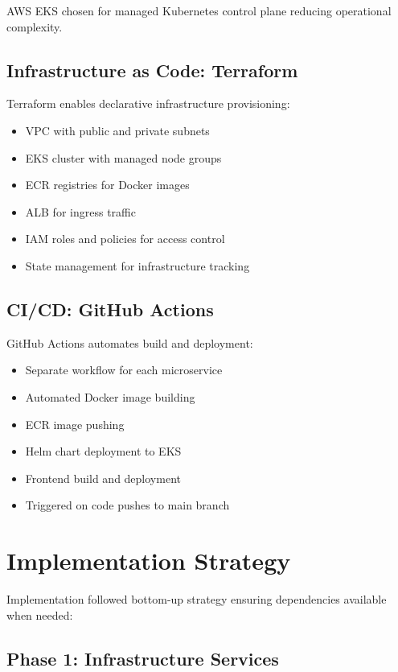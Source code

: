 AWS EKS chosen for managed Kubernetes control plane reducing operational complexity.

\subsection{Infrastructure as Code: Terraform}

Terraform enables declarative infrastructure provisioning:
\begin{itemize}
    \item VPC with public and private subnets
    \item EKS cluster with managed node groups
    \item ECR registries for Docker images
    \item ALB for ingress traffic
    \item IAM roles and policies for access control
    \item State management for infrastructure tracking
\end{itemize}

\subsection{CI/CD: GitHub Actions}

GitHub Actions automates build and deployment:
\begin{itemize}
    \item Separate workflow for each microservice
    \item Automated Docker image building
    \item ECR image pushing
    \item Helm chart deployment to EKS
    \item Frontend build and deployment
    \item Triggered on code pushes to main branch
\end{itemize}

\section{Implementation Strategy}

Implementation followed bottom-up strategy ensuring dependencies available when needed:

\subsection{Phase 1: Infrastructure Services}

